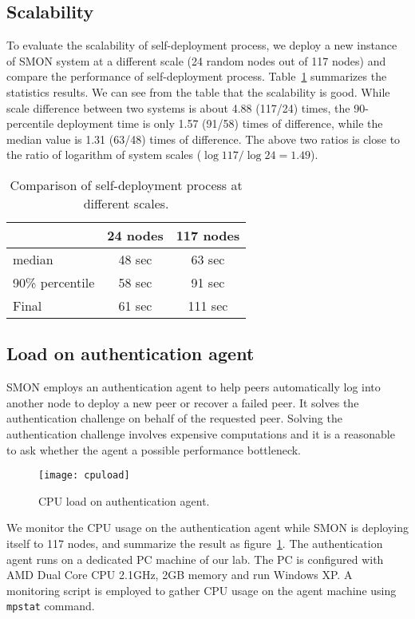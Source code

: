 \subsection{Scalability}

To evaluate the scalability of self-deployment process, we
deploy a new instance of SMON system at a different scale
(24 random nodes out of 117 nodes) and compare the
performance of self-deployment process.
Table~\ref{tbl:scalability} summarizes the statistics
results.  We can see from the table that the scalability is
good.  While scale difference between two systems is about
4.88 (117/24) times, the 90-percentile deployment time is
only 1.57 (91/58) times of difference, while the median
value is 1.31 (63/48) times of difference.  The above two
ratios is close to the ratio of logarithm of system scales
($\log 117 / \log 24 = 1.49$).
\begin{table}[hbt]
\centering
\begin{tabular}{|l|c|c|}
\hline
  & 24 nodes & 117 nodes\\
\hline
median & 48 sec & 63 sec \\
\hline
90\% percentile & 58 sec & 91 sec\\
\hline
Final & 61 sec & 111 sec\\
\hline
\end{tabular}
\caption{Comparison of self-deployment process at different
scales.}
\label{tbl:scalability}
\end{table}

\subsection{Load on authentication agent}

SMON employs an authentication agent to help peers
automatically log into another node to deploy a new peer or
recover a failed peer. It solves the authentication
challenge on behalf of the requested peer. Solving the
authentication challenge involves expensive computations and
it is a reasonable to ask whether the agent a possible
performance bottleneck.
\begin{figure}[hbt]
\centering
\texttt{[image: cpuload]}
\caption{CPU load on authentication agent.}
\label{fig:agentload}
\end{figure}

We monitor the CPU usage on the authentication agent while
SMON is deploying itself to 117 nodes, and summarize the
result as figure~\ref{fig:agentload}. The authentication
agent runs on a dedicated PC machine of our lab. The PC is
configured with AMD Dual Core CPU 2.1GHz, 2GB memory and run
Windows XP. A monitoring script is employed to gather CPU
usage on the agent machine using \texttt{mpstat} command.

